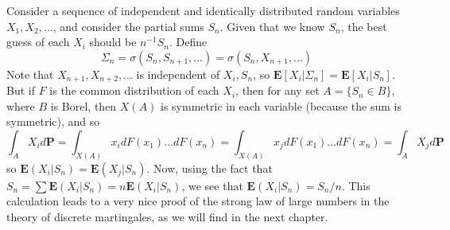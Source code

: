\begin{example}
    Consider a sequence of independent and identically distributed random variables $X_1, X_2, \dots$, and consider the partial sums $S_n$. Given that we know $S_n$, the best guess of each $X_i$ should be $n^{-1} S_n$. Define
    \[ \Sigma_n = \sigma(S_n, S_{n+1}, \dots) = \sigma(S_n, X_{n+1}, \dots) \]
    Note that $X_{n+1}, X_{n+2}, \dots$ is independent of $X_i, S_n$, so $\mathbf{E}[X_i|\Sigma_n] = \mathbf{E}[X_i|S_n]$. But if $F$ is the common distribution of each $X_i$, then for any set $A = \{ S_n \in B \}$, where $B$ is Borel, then $X(A)$ is symmetric in each variable (because the sum is symmetric), and so
    \[ \int_A X_i d\mathbf{P} = \int_{X(A)} x_i dF(x_1) \dots dF(x_n) = \int_{X(A)} x_j dF(x_1) \dots dF(x_n) = \int_A X_j d\mathbf{P} \]
    so $\mathbf{E}(X_i|S_n) = \mathbf{E}(X_j|S_n)$. Now, using the fact that $S_n = \sum \mathbf{E}(X_i|S_n) = n\mathbf{E}(X_i|S_n)$, we see that $\mathbf{E}(X_i|S_n) = S_n/n$. This calculation leads to a very nice proof of the strong law of large numbers in the theory of discrete martingales, as we will find in the next chapter.
\end{example}





